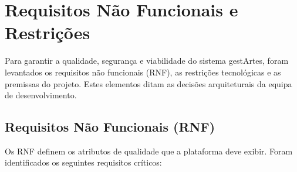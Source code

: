 \documentclass[12pt,a4paper]{report}
\begin{document}
\chapter{Requisitos Não Funcionais e Restrições}

Para garantir a qualidade, segurança e viabilidade do sistema gestArtes, foram levantados os requisitos não funcionais (RNF), as restrições tecnológicas e as premissas do projeto. Estes elementos ditam as decisões arquiteturais da equipa de desenvolvimento.

\section{Requisitos Não Funcionais (RNF)}
Os RNF definem os atributos de qualidade que a plataforma deve exibir. Foram identificados os seguintes requisitos críticos:
\end{document}

